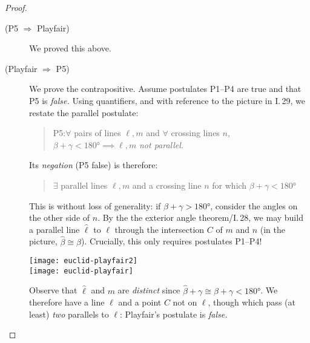 \begin{proof}
	\begin{description}
		\item[\normalfont (P5 $\Rightarrow$ Playfair)] We proved this above.
		\item[\normalfont (Playfair $\Rightarrow$ P5)] We prove the contrapositive. Assume postulates P1--P4 are true and that P5 is \emph{false.} Using quantifiers, and with reference to the picture in I.\,29, we restate the parallel postulate:
	\begin{quote}
	  P5:\lstsp $\forall$ pairs of lines $\ell,m$ and $\forall$ crossing lines $n$, \  $\beta+\gamma<\ang{180}\implies\ell,m$ \emph{not parallel.}
	\end{quote}
	\begin{minipage}[t]{0.62\linewidth}\vspace{-7pt}
		Its \emph{negation} (P5 false) is therefore:
		\begin{quote}
	  	$\exists$ parallel lines $\ell,m$ and a crossing line $n$ for which $\beta+\gamma<\ang{180}$
		\end{quote}
		This is without loss of generality: if $\beta+\gamma>\ang{180}$, consider the angles on the other side of $n$.\medbreak
		By the the exterior angle theorem/I.\,28, we may build a parallel line $\hat\ell$ to $\ell$ through the intersection $C$ of $m$ and $n$ (in the picture, $\hat\beta\cong\beta$). Crucially, this only requires postulates P1--P4!
	\end{minipage}
	\hfill
	\begin{minipage}[t]{0.37\linewidth}\vspace{0pt}
		\flushright
		\texttt{[image: euclid-playfair2]}\\
		\texttt{[image: euclid-playfair]}
	\end{minipage}\smallbreak
	Observe that $\hat\ell$ and $m$ are \emph{distinct} since $\hat\beta+\gamma\cong\beta+\gamma<\ang{180}$.
	We therefore have a line $\ell$ and a point $C$ not on $\ell$, though which pass (at least) \emph{two} parallels to $\ell$: Playfair's postulate is \emph{false.} \qedhere
	\end{description}
\end{proof}



\label{pg:sphere}

